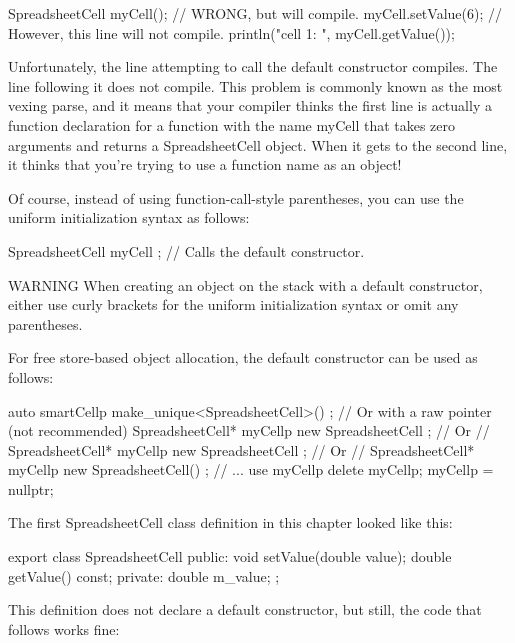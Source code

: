 \begin{cpp}
SpreadsheetCell myCell(); // WRONG, but will compile.
myCell.setValue(6); // However, this line will not compile.
println("cell 1: {}", myCell.getValue());
\end{cpp}

Unfortunately, the line attempting to call the default constructor compiles. The line following it does not compile. This problem is commonly known as the most vexing parse, and it means that your compiler thinks the first line is actually a function declaration for a function with the name myCell that takes zero arguments and returns a SpreadsheetCell object. When it gets to the second line, it thinks that you’re trying to use a function name as an object!

Of course, instead of using function-call-style parentheses, you can use the uniform initialization syntax as follows:

\begin{cpp}
SpreadsheetCell myCell { }; // Calls the default constructor.
\end{cpp}

\begin{myWarning}{WARNING}
When creating an object on the stack with a default constructor, either use curly brackets for the uniform initialization syntax or omit any parentheses.
\end{myWarning}

For free store-based object allocation, the default constructor can be used as follows:

\begin{cpp}
auto smartCellp { make_unique<SpreadsheetCell>() };
// Or with a raw pointer (not recommended)
SpreadsheetCell* myCellp { new SpreadsheetCell { } };
// Or
// SpreadsheetCell* myCellp { new SpreadsheetCell };
// Or
// SpreadsheetCell* myCellp { new SpreadsheetCell() };
// ... use myCellp
delete myCellp; myCellp = nullptr;
\end{cpp}


The first SpreadsheetCell class definition in this chapter looked like this:

\begin{cpp}
export class SpreadsheetCell
{
    public:
        void setValue(double value);
        double getValue() const;
    private:
        double m_value;
};
\end{cpp}

This definition does not declare a default constructor, but still, the code that follows works fine:

